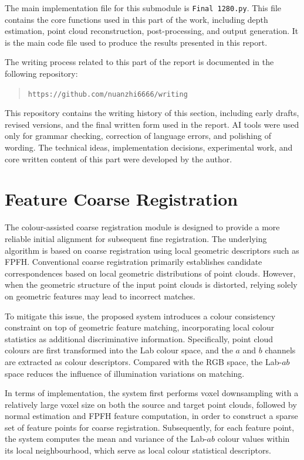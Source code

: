 \documentclass[12pt]{interim_report}
\begin{document}
The main implementation file for this submodule is \texttt{Final 1280.py}. This file contains the core functions used in this part of the work, including depth estimation, point cloud reconstruction, post-processing, and output generation. It is the main code file used to produce the results presented in this report.

The writing process related to this part of the report is documented in the following repository:

\begin{quote}
\texttt{https://github.com/nuanzhi6666/writing}
\end{quote}

This repository contains the writing history of this section, including early drafts, revised versions, and the final written form used in the report. AI tools were used only for grammar checking, correction of language errors, and polishing of wording. The technical ideas, implementation decisions, experimental work, and core written content of this part were developed by the author.

\section{Feature Coarse Registration}
\label{subsec:feature-coarse-registration-qingzhou-zhang}

The colour-assisted coarse registration module is designed to provide a more reliable initial alignment for subsequent fine registration. The underlying algorithm is based on coarse registration using local geometric descriptors such as FPFH. Conventional coarse registration primarily establishes candidate correspondences based on local geometric distributions of point clouds. However, when the geometric structure of the input point clouds is distorted, relying solely on geometric features may lead to incorrect matches.

To mitigate this issue, the proposed system introduces a colour consistency constraint on top of geometric feature matching, incorporating local colour statistics as additional discriminative information. Specifically, point cloud colours are first transformed into the Lab colour space, and the $a$ and $b$ channels are extracted as colour descriptors. Compared with the RGB space, the Lab-$ab$ space reduces the influence of illumination variations on matching.

In terms of implementation, the system first performs voxel downsampling with a relatively large voxel size on both the source and target point clouds, followed by normal estimation and FPFH feature computation, in order to construct a sparse set of feature points for coarse registration. Subsequently, for each feature point, the system computes the mean and variance of the Lab-$ab$ colour values within its local neighbourhood, which serve as local colour statistical descriptors.
\end{document}
